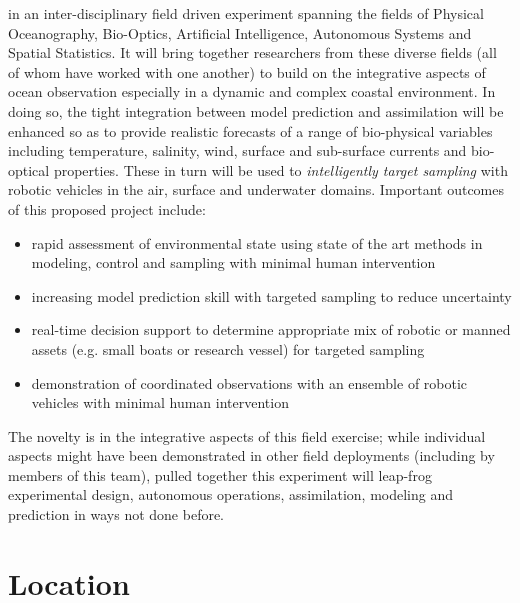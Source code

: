 \proj in an inter-disciplinary field driven experiment spanning the
fields of Physical Oceanography, Bio-Optics, Artificial Intelligence,
Autonomous Systems and Spatial Statistics. It will bring together
researchers from these diverse fields (all of whom have worked with
one another) to build on the integrative aspects of ocean observation
especially in a dynamic and complex coastal environment.  In doing so,
the tight integration between model prediction and assimilation will
be enhanced so as to provide realistic forecasts of a range of
bio-physical variables including temperature, salinity, wind, surface
and sub-surface currents and bio-optical properties. These in turn
will be used to \emph{intelligently target sampling} with robotic
vehicles in the air, surface and underwater domains. Important
outcomes of this proposed project include:

\begin{itemize}[noitemsep,topsep=5pt,parsep=0pt,partopsep=0pt,leftmargin=0.5cm]

\item rapid assessment of environmental state using state of the art
  methods in modeling, control and sampling with minimal human intervention
\item increasing model prediction skill with targeted sampling to
  reduce uncertainty
\item real-time decision support to determine appropriate mix of
  robotic or manned assets (e.g. small boats or research vessel) for
  targeted sampling
\item demonstration of coordinated observations with an ensemble of
  robotic vehicles with minimal human intervention
\end{itemize}

The novelty is in the integrative aspects of this field exercise;
while individual aspects might have been demonstrated in other field
deployments (including by members of this team), pulled together this
experiment will leap-frog experimental design, autonomous operations,
assimilation, modeling and prediction in ways not done before.

\section*{Location}

